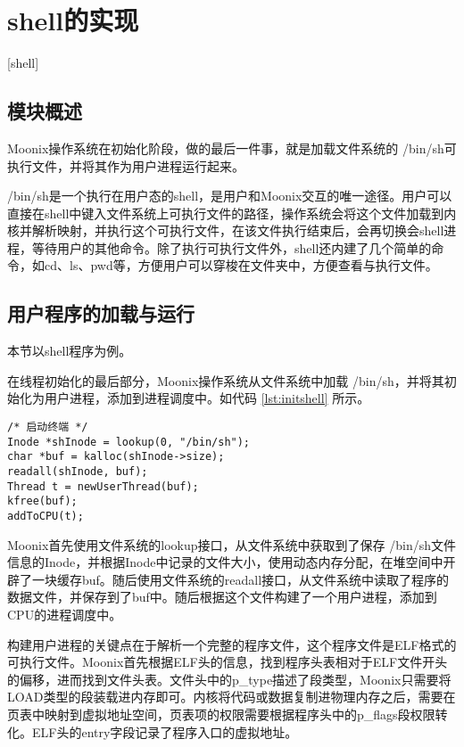 
\chapter{shell的实现}[shell]
\label{chapter:shell}

\section{模块概述}

Moonix操作系统在初始化阶段，做的最后一件事，就是加载文件系统的 /bin/sh可执行文件，并将其作为用户进程运行起来。

/bin/sh是一个执行在用户态的shell，是用户和Moonix交互的唯一途径。用户可以直接在shell中键入文件系统上可执行文件的路径，操作系统会将这个文件加载到内核并解析映射，并执行这个可执行文件，在该文件执行结束后，会再切换会shell进程，等待用户的其他命令。除了执行可执行文件外，shell还内建了几个简单的命令，如cd、ls、pwd等，方便用户可以穿梭在文件夹中，方便查看与执行文件。

\section{用户程序的加载与运行}

本节以shell程序为例。

在线程初始化的最后部分，Moonix操作系统从文件系统中加载 /bin/sh，并将其初始化为用户进程，添加到进程调度中。如代码 \ref{lst:initshell} 所示。

\begin{minipage}[c]{0.95\textwidth}
\begin{lstlisting}[language={moonix}, caption={Moonix加载shell}, label={lst:initshell}]
/* 启动终端 */
Inode *shInode = lookup(0, "/bin/sh");
char *buf = kalloc(shInode->size);
readall(shInode, buf);
Thread t = newUserThread(buf);
kfree(buf);
addToCPU(t);
\end{lstlisting}
\end{minipage}

Moonix首先使用文件系统的lookup接口，从文件系统中获取到了保存 /bin/sh文件信息的Inode，并根据Inode中记录的文件大小，使用动态内存分配，在堆空间中开辟了一块缓存buf。随后使用文件系统的readall接口，从文件系统中读取了程序的数据文件，并保存到了buf中。随后根据这个文件构建了一个用户进程，添加到CPU的进程调度中。

构建用户进程的关键点在于解析一个完整的程序文件，这个程序文件是ELF格式的可执行文件。Moonix首先根据ELF头的信息，找到程序头表相对于ELF文件开头的偏移，进而找到文件头表。文件头中的p\_type描述了段类型，Moonix只需要将LOAD类型的段装载进内存即可。内核将代码或数据复制进物理内存之后，需要在页表中映射到虚拟地址空间，页表项的权限需要根据程序头中的p\_flags段权限转化。ELF头的entry字段记录了程序入口的虚拟地址。

